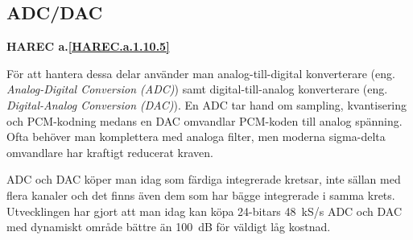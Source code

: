 \subsection{ADC/DAC}
\textbf{HAREC a.\ref{HAREC.a.1.10.5}\label{myHAREC.a.1.10.5}}

\begin{rev-nytt}[MAD]

För att hantera dessa delar använder man analog-till-digital konverterare
(eng. \emph{Analog-Digital Conversion (ADC)}) samt digital-till-analog
konverterare (eng. \emph{Digital-Analog Conversion (DAC)}). En ADC tar hand om
sampling, kvantisering och PCM-kodning medans en DAC omvandlar PCM-koden till
analog spänning. Ofta behöver man komplettera med analoga filter, men moderna
sigma-delta omvandlare har kraftigt reducerat kraven.

ADC och DAC köper man idag som färdiga integrerade kretsar, inte sällan med
flera kanaler och det finns även dem som har bägge integrerade i samma krets.
Utvecklingen har gjort att man idag kan köpa 24-bitars 48~kS/s ADC och DAC med
dynamiskt område bättre än 100~dB för väldigt låg kostnad.

\end{rev-nytt}

